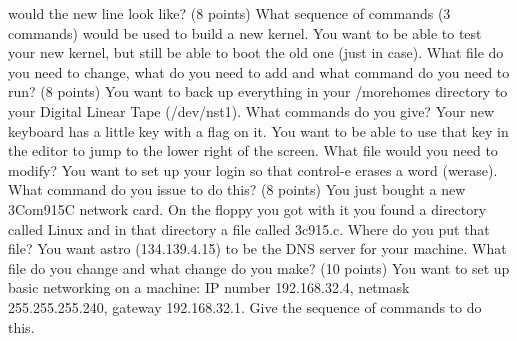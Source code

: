 would the new line look like?
\vskip 1.0in
\ques
(8 points)
What sequence of commands (3 commands) would be used to build a new kernel.
\vskip 0.4in
You want to be able to test your new kernel, but still be able to
boot the old one (just in case).
What file do you need to change, what do you need to add and
what command do you need to run?
\vfill\eject
\ques
(8 points)
You want to back up everything in your {\ltt{}/morehomes} directory to
your Digital Linear Tape ({\ltt{}/dev/nst1}). What commands do you give?
\vskip 0.8in
Your new keyboard has a little key with a flag on it. You want to be
able to use that key in the editor to jump to the lower right of the
screen. What file would you need to modify?
\vskip 0.4in
You want to set up your login so that control-e erases a word ({\ltt{}werase}).
What command do you issue to do this?
\vskip 0.4in
\ques
(8 points)
You just bought a new 3Com915C network card. On the floppy you got with
it you found a directory called {\ltt{}Linux} and in that directory
a file called {\ltt{}3c915.c}. Where do you put that file?
\vskip 0.5in
You want {\ltt{}astro} ({\ltt{}134.139.4.15}) to be the DNS server for your
machine. What file do you change and what change do you make?
\vskip 1.0in
\ques
(10 points)
You want to set up basic networking on a machine:
IP number {\ltt{}192.168.32.4},
netmask {\ltt{}255.255.255.240}, 
gateway {\ltt{}192.168.32.1}.
Give the sequence of commands to do this.

\bye
